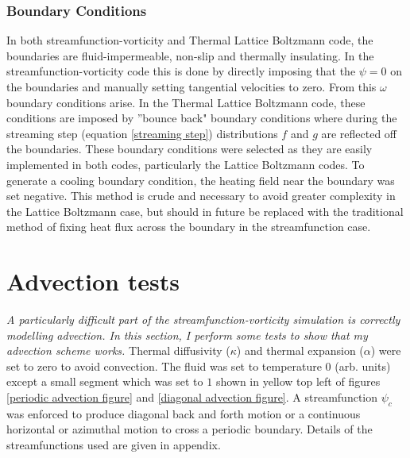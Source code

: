 \documentclass{article}
\begin{document}
\subsubsection*{Boundary Conditions}
\noindent In both streamfunction-vorticity and Thermal Lattice Boltzmann code, the 
boundaries are fluid-impermeable, non-slip and thermally insulating. In the 
streamfunction-vorticity code this is done by directly imposing that the $\psi=0$ on the boundaries and manually setting tangential velocities to zero. 
From this $\omega$ boundary conditions arise. In the Thermal Lattice Boltzmann code, these conditions are imposed by ''bounce back" boundary conditions 
where during the streaming step (equation \ref{streaming step}) distributions $f$ and $g$ are reflected off the boundaries. These boundary conditions 
were selected as they are easily implemented in both codes, particularly the Lattice Boltzmann codes. To generate a cooling boundary condition, the 
heating field near the boundary was set negative. This method is crude and necessary to avoid greater complexity in the Lattice Boltzmann case, but 
should in future be replaced with the traditional method of fixing heat flux across the boundary in the streamfunction case.


\section*{Advection tests}
{\it{A particularly difficult part of the streamfunction-vorticity simulation is correctly modelling advection. In this section, I perform some tests to show that my advection scheme works.}}
\vspace{0.3cm}
\newline
\noindent Thermal diffusivity ($\kappa$) and thermal expansion ($\alpha$) were set to zero to avoid convection. The fluid was set to temperature 0 (arb. units) except a small segment which was set to $1$ shown in yellow top left of figures \ref{periodic advection figure} and \ref{diagonal advection figure}. A streamfunction $\psi_c$ was enforced to produce diagonal back and forth motion or a continuous horizontal or azimuthal motion to cross a periodic boundary. Details of the streamfunctions used are given in appendix.
\end{document}
